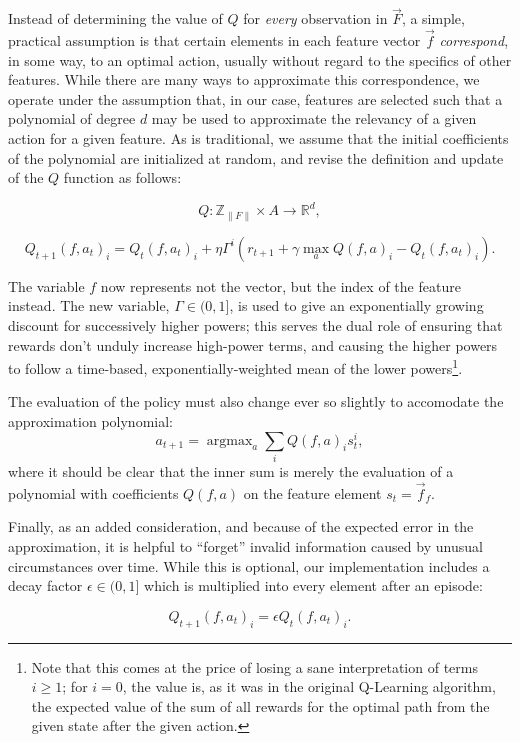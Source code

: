\documentclass{article}
\begin{document}
	Instead of determining the value of $Q$ for {\it every} observation in
	$\vec{F}$, a simple, practical assumption is that certain elements in each
	feature vector $\vec{f}$ {\it correspond}, in some way, to an optimal
	action, usually without regard to the specifics of other features. While
	there are many ways to approximate this correspondence, we operate under
	the assumption that, in our case, features are selected such that a
	polynomial of degree $d$ may be used to approximate the relevancy of a
	given action for a given feature. As is traditional, we assume that the
	initial coefficients of the polynomial are initialized at random, and
	revise the definition and update of the $Q$ function as follows:

	$$
	Q: \mathbb{Z}_{\|F\|} \times A \rightarrow \mathbb{R}^d,
	$$

	$$
	Q_{t+1}(f,a_t)_i = Q_t(f,a_t)_i + \eta \Gamma^i ( r_{t+1} + \gamma \operatorname{max}_a Q(f,a)_i - Q_t(f,a_t)_i ).
	$$

	The variable $f$ now represents not the vector, but the index of the
	feature instead. The new variable, $\Gamma \in (0, 1]$, is used to give an
	exponentially growing discount for successively higher powers; this serves
	the dual role of ensuring that rewards don't unduly increase high-power
	terms, and causing the higher powers to follow a time-based,
	exponentially-weighted mean of the lower powers\footnote{Note that this
	comes at the price of losing a sane interpretation of terms $i \geq 1$; for
	$i = 0$, the value is, as it was in the original Q-Learning algorithm, the
	expected value of the sum of all rewards for the optimal path from the
	given state after the given action.}.

	The evaluation of the policy must also change ever so slightly to
	accomodate the approximation polynomial:
	$$
	a_{t+1} = \operatorname{argmax}_a \sum_i  Q(f,a)_i s_{t}^i,
	$$
	where it should be clear that the inner sum is merely the evaluation of a
	polynomial with coefficients $Q(f,a)$ on the feature element $s_t = \vec{f}_f$.

	Finally, as an added consideration, and because of the expected error in
	the approximation, it is helpful to ``forget'' invalid information caused by
	unusual circumstances over time. While this is optional, our implementation
	includes a decay factor $\epsilon \in (0, 1]$ which is multiplied into
	every element after an episode:

	$$
	Q_{t+1}(f,a_t)_i = \epsilon Q_t(f,a_t)_i.
	$$
\end{document}
